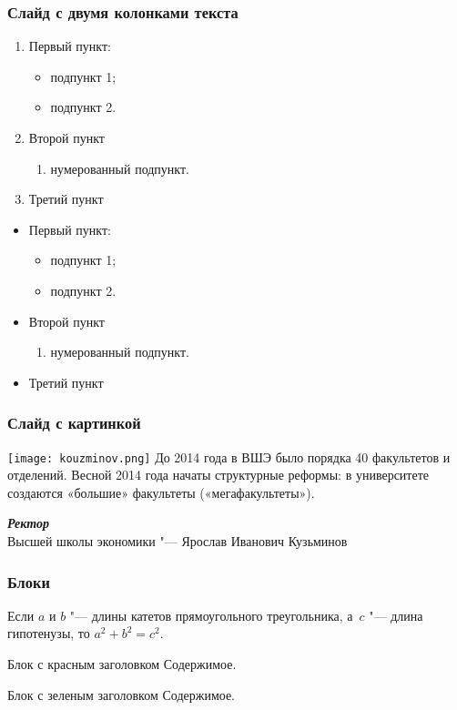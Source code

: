 \documentclass{beamer}
\begin{document}
\begin{frame}
\frametitle{Слайд с двумя колонками текста}
	\begin{multicols}{2}
			\begin{enumerate} 
		\item Первый пункт:
		\begin{itemize}
			\item подпункт 1;
			\item подпункт 2.
		\end{itemize}
		\item Второй пункт
		\begin{enumerate}
			\item нумерованный подпункт.
		\end{enumerate} 
		\item Третий пункт
	\end{enumerate} 
	\columnbreak
	\begin{itemize}
		\item Первый пункт:
		\begin{itemize}
			\item подпункт 1;
			\item подпункт 2.
		\end{itemize}
		\item Второй пункт
		\begin{enumerate}
			\item нумерованный подпункт.
		\end{enumerate}
		\item Третий пункт
	\end{itemize}
	\end{multicols}
\end{frame}

\begin{frame}
\frametitle{Слайд с картинкой}
	\begin{multicols}{2}
		\texttt{[image: kouzminov.png]}
		\columnbreak
		До 2014 года в ВШЭ было порядка 40 факультетов и отделений. Весной 2014 года начаты структурные реформы: в университете создаются «большие» факультеты («мегафакультеты»).
		\medskip 

		\textbf{\textit{Ректор}} \\ Высшей школы экономики "--- \alert{Ярослав Иванович Кузьминов}
	\end{multicols}
\end{frame}

\begin{frame}
\frametitle{Блоки}
	\begin{theorem}[Пифагора]
		Если $a$ и $b$ "--- длины катетов прямоугольного треугольника, а~$c$ "--- длина гипотенузы, то $a^2+b^2=c^2$.
	\end{theorem}

	\begin{alertblock}{Блок с красным заголовком}
		Содержимое.
	\end{alertblock}

	\begin{exampleblock}{Блок с зеленым заголовком}
		Содержимое.
	\end{exampleblock}
\end{frame}
\end{document}
